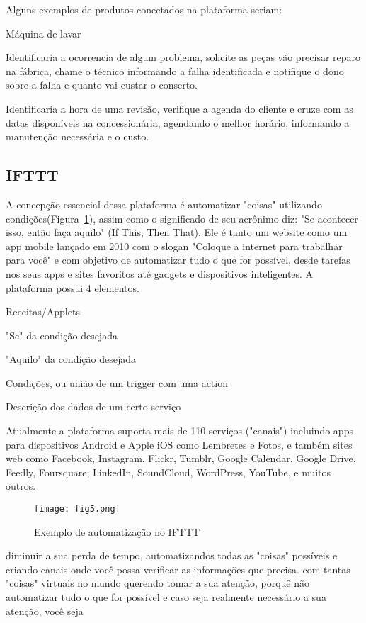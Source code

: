 	Alguns exemplos de produtos conectados na plataforma seriam: 
	\begin{labeling}{M\'aquina de lavar}
		\item[M\'aquina de lavar] Identificaria a ocorrencia de algum problema, solicite as pe\c{c}as v\~ao precisar reparo na f\'abrica, chame o t\'ecnico informando a falha identificada e notifique o dono sobre a falha e quanto vai custar o conserto. 
		\item[Carro] Identificaria a hora de uma revis\~ao, verifique a agenda do cliente e cruze com as datas dispon\'iveis na concession\'aria, agendando o melhor hor\'ario, informando a manuten\c{c}\~ao necess\'aria e o custo.
	\end{labeling}

\subsection{IFTTT}
	A concep\c{c}\~ao essencial dessa plataforma \'e automatizar "coisas" utilizando condi\c{c}\~oes(Figura~\ref{fig:ifttt}), assim como o significado de seu acr\^onimo diz: "Se acontecer isso, ent\~ao fa\c{c}a aquilo" (If This, Then That). Ele \'e tanto um website como um app mobile lan\c{c}ado em 2010 com o slogan "Coloque a internet para trabalhar para voc\^e" e com objetivo de automatizar tudo o que for poss\'ivel, desde tarefas nos seus apps e sites favoritos at\'e gadgets e dispositivos inteligentes. A plataforma possui 4 elementos.
	
	\begin{labeling}{Receitas/Applets}
		\item[Gatilhos] "Se" da condi\c{c}\~ao desejada
		\item[A\c{c}\~oes] "Aquilo" da condi\c{c}\~ao desejada
		\item[Receitas/Applets] Condi\c{c}\~oes, ou uni\~ao de um trigger com uma action
		\item[Canais/Servi\c{c}os]  Descri\c{c}\~ao dos dados de um certo servi\c{c}o
	\end{labeling}
	
	Atualmente a plataforma suporta mais de 110 servi\c{c}os ("canais") incluindo apps para dispositivos Android e Apple iOS como Lembretes e Fotos, e tamb\'em sites web como Facebook, Instagram, Flickr, Tumblr, Google Calendar, Google Drive, Feedly, Foursquare, LinkedIn, SoundCloud, WordPress, YouTube, e muitos outros.
	
	\begin{figure}[ht]
		\centering
		\texttt{[image: fig5.png]}
		\caption{Exemplo de automatiza\c{c}\~ao no IFTTT}
		\label{fig:ifttt}
	\end{figure}
	
	diminuir a sua perda de tempo, automatizandos todas as "coisas" poss\'iveis e criando canais onde voc\^e possa verificar as informa\c{c}\~oes que precisa.  com tantas "coisas" virtuais no mundo querendo tomar a sua aten\c{c}\~ao, porqu\^e n\~ao automatizar tudo o que for poss\'ivel e caso seja realmente necess\'ario a sua aten\c{c}\~ao, voc\^e seja 
	
